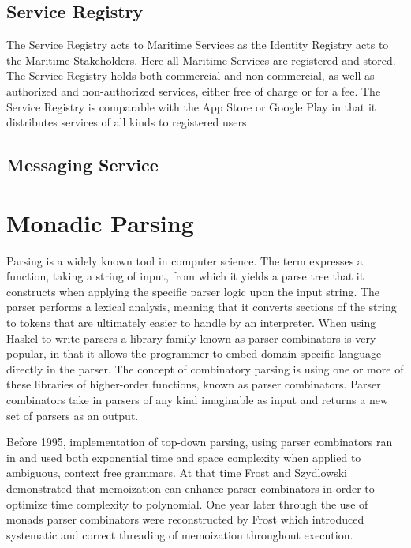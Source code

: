 \subsection{Service Registry}
The Service Registry acts to Maritime Services as the Identity Registry acts to the Maritime Stakeholders. Here all Maritime Services are registered and stored. The Service Registry holds both commercial and non-commercial, as well as authorized and non-authorized services, either free of charge or for a fee. The Service Registry is comparable with the App Store or Google Play in that it distributes services of all kinds to registered users.\cite{efficienSea2}
\subsection{Messaging Service}
\cite{efficienSea2}

\section{Monadic Parsing}

Parsing is a widely known tool in computer science. The term expresses a function, taking a string of input, from which it yields a parse tree that it constructs when applying the specific parser logic upon the input string. The parser performs a lexical analysis, meaning that it converts sections of the string to tokens that are ultimately easier to handle by an interpreter. When using Haskel to write parsers a library family known as parser combinators is very popular, in that it allows the programmer to embed domain specific language directly in the parser. The concept of combinatory parsing is using one or more of these libraries of higher-order functions, known as parser combinators. Parser combinators take in parsers of any kind imaginable as input and returns a new set of parsers as an output.

Before 1995, implementation of top-down parsing, using parser combinators ran in and used both exponential time and space complexity when applied to ambiguous, context free grammars. At that time Frost and Szydlowski demonstrated that memoization can enhance parser combinators in order to optimize time complexity to polynomial. One year later through the use of monads parser combinators were reconstructed by Frost which introduced systematic and correct threading of memoization throughout execution\cite{memoization}.

